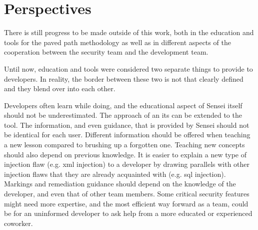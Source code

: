 %
%
%
%

\section{Perspectives}
There is still progress to be made outside of this work, both in the education and tools for the paved path methodology as well as in different aspects of the cooperation between the security team and the development team.


Until now, education and tools were considered two separate things to provide to developers.
In reality, the border between these two is not that clearly defined and they blend over into each other. 


Developers often learn while doing, and the educational aspect of Sensei itself should not be underestimated. The approach of an \gls{its} can be extended to the tool. The information, and even guidance, that is provided by Sensei should not be identical for each user. Different information should be offered when teaching a new lesson compared to brushing up a forgotten one. Teaching new concepts should also depend on previous knowledge. It is easier to explain a new type of injection flaw (e.g. \gls{xml} injection) to a developer by drawing parallels with other injection flaws that they are already acquainted with (e.g. \gls{sql} injection).
Markings and remediation guidance should depend on the knowledge of the developer, and even that of other team members. Some critical security features might need more expertise, and the most efficient way forward as a team, could be for an uninformed developer to ask help from a more educated or experienced coworker.

